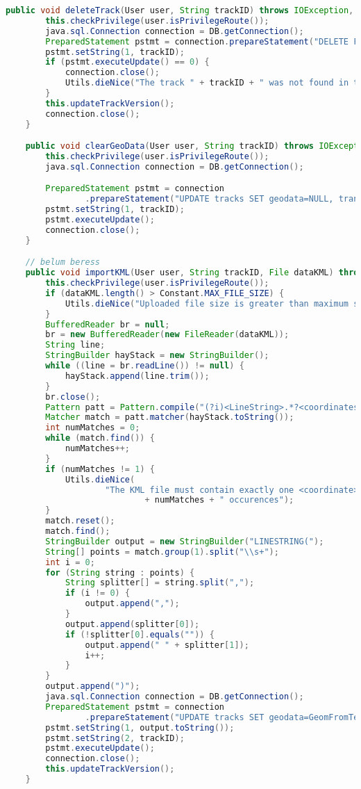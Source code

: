 \begin{lstlisting}[language=Java,basicstyle=\tiny,caption=models/TracksManager.java,label={lst:tracksmanager.java}]
	public void deleteTrack(User user, String trackID) throws IOException, SQLException {
		this.checkPrivilege(user.isPrivilegeRoute());
		java.sql.Connection connection = DB.getConnection();
		PreparedStatement pstmt = connection.prepareStatement("DELETE FROM tracks WHERE trackId=?");
		pstmt.setString(1, trackID);
		if (pstmt.executeUpdate() == 0) {
			connection.close();
			Utils.dieNice("The track " + trackID + " was not found in the database");
		}
		this.updateTrackVersion();
		connection.close();
	}

	public void clearGeoData(User user, String trackID) throws IOException, SQLException {
		this.checkPrivilege(user.isPrivilegeRoute());
		java.sql.Connection connection = DB.getConnection();

		PreparedStatement pstmt = connection
				.prepareStatement("UPDATE tracks SET geodata=NULL, transferNodes=NULL WHERE trackId=?");
		pstmt.setString(1, trackID);
		pstmt.executeUpdate();
		connection.close();
	}

	// belum beress
	public void importKML(User user, String trackID, File dataKML) throws IOException, SQLException {
		this.checkPrivilege(user.isPrivilegeRoute());
		if (dataKML.length() > Constant.MAX_FILE_SIZE) {
			Utils.dieNice("Uploaded file size is greater than maximum size allowed (" + Constant.MAX_FILE_SIZE + ")");
		}
		BufferedReader br = null;
		br = new BufferedReader(new FileReader(dataKML));
		String line;
		StringBuilder hayStack = new StringBuilder();
		while ((line = br.readLine()) != null) {
			hayStack.append(line.trim());
		}
		br.close();
		Pattern patt = Pattern.compile("(?i)<LineString>.*?<coordinates>(.*?)</coordinates>.*?</LineString>");
		Matcher match = patt.matcher(hayStack.toString());
		int numMatches = 0;
		while (match.find()) {
			numMatches++;
		}
		if (numMatches != 1) {
			Utils.dieNice(
					"The KML file must contain exactly one <coordinate> tag inside one <LineString> tag. But I found "
							+ numMatches + " occurences");
		}
		match.reset();
		match.find();
		StringBuilder output = new StringBuilder("LINESTRING(");
		String[] points = match.group(1).split("\\s+");
		int i = 0;
		for (String string : points) {
			String splitter[] = string.split(",");
			if (i != 0) {
				output.append(",");
			}
			output.append(splitter[0]);
			if (!splitter[0].equals("")) {
				output.append(" " + splitter[1]);
				i++;
			}
		}
		output.append(")");
		java.sql.Connection connection = DB.getConnection();
		PreparedStatement pstmt = connection
				.prepareStatement("UPDATE tracks SET geodata=GeomFromText(?), transferNodes=NULL WHERE trackId=?");
		pstmt.setString(1, output.toString());
		pstmt.setString(2, trackID);
		pstmt.executeUpdate();
		connection.close();
		this.updateTrackVersion();
	}


\end{lstlisting}
